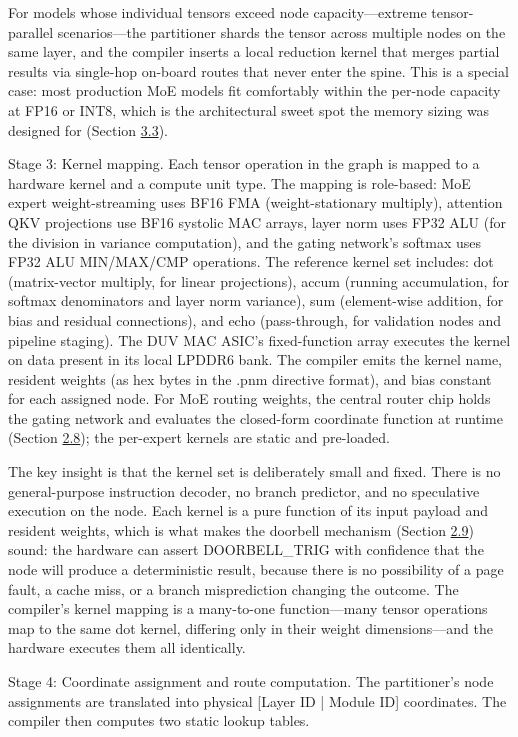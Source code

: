 \documentclass[10pt,twocolumn]{article}
\begin{document}
For models whose individual tensors exceed node capacity---extreme tensor-parallel scenarios---the partitioner shards the tensor across multiple nodes on the same layer, and the compiler inserts a local reduction kernel that merges partial results via single-hop on-board routes that never enter the spine. This is a special case: most production MoE models fit comfortably within the per-node capacity at FP16 or INT8, which is the architectural sweet spot the memory sizing was designed for (Section \hyperref[sec:3.3]{3.3}).

Stage 3: Kernel mapping. Each tensor operation in the graph is mapped to a hardware kernel and a compute unit type. The mapping is role-based: MoE expert weight-streaming uses BF16 FMA (weight-stationary multiply), attention QKV projections use BF16 systolic MAC arrays, layer norm uses FP32 ALU (for the division in variance computation), and the gating network's softmax uses FP32 ALU MIN/MAX/CMP operations. The reference kernel set includes: dot (matrix-vector multiply, for linear projections), accum (running accumulation, for softmax denominators and layer norm variance), sum (element-wise addition, for bias and residual connections), and echo (pass-through, for validation nodes and pipeline staging). The DUV MAC ASIC's fixed-function array executes the kernel on data present in its local LPDDR6 bank. The compiler emits the kernel name, resident weights (as hex bytes in the .pnm directive format), and bias constant for each assigned node. For MoE routing weights, the central router chip holds the gating network and evaluates the closed-form coordinate function at runtime (Section \hyperref[sec:2.8]{2.8}); the per-expert kernels are static and pre-loaded.

The key insight is that the kernel set is deliberately small and fixed. There is no general-purpose instruction decoder, no branch predictor, and no speculative execution on the node. Each kernel is a pure function of its input payload and resident weights, which is what makes the doorbell mechanism (Section \hyperref[sec:2.9]{2.9}) sound: the hardware can assert DOORBELL\_TRIG with confidence that the node will produce a deterministic result, because there is no possibility of a page fault, a cache miss, or a branch misprediction changing the outcome. The compiler's kernel mapping is a many-to-one function---many tensor operations map to the same dot kernel, differing only in their weight dimensions---and the hardware executes them all identically.

Stage 4: Coordinate assignment and route computation. The partitioner's node assignments are translated into physical [Layer ID | Module ID] coordinates. The compiler then computes two static lookup tables.
\end{document}
